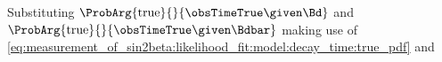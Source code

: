 %
%
Substituting $\ProbArg{\text{true}}{}{\obsTimeTrue \given \Bd}$ and
$\ProbArg{\text{true}}{}{\obsTimeTrue \given \Bdbar}$ making use of
\cref{eq:measurement_of_sin2beta:likelihood_fit:model:decay_time:true_pdf} and

